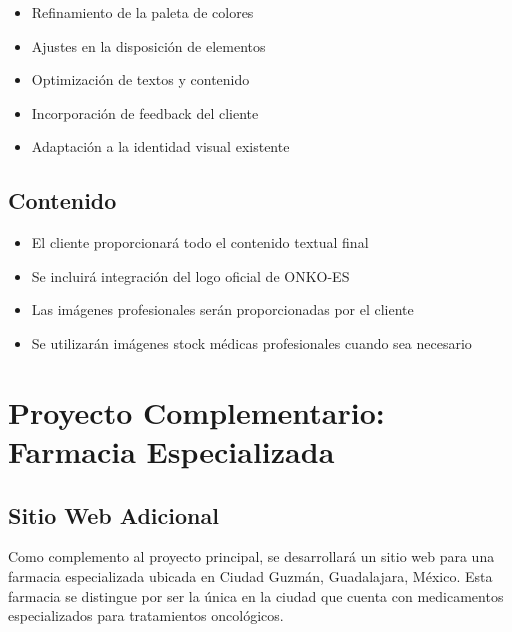 \documentclass[12pt,a4paper]{article}
\begin{document}
\begin{itemize}
    \item Refinamiento de la paleta de colores
    \item Ajustes en la disposición de elementos
    \item Optimización de textos y contenido
    \item Incorporación de feedback del cliente
    \item Adaptación a la identidad visual existente
\end{itemize}

\subsection{Contenido}
\begin{itemize}
    \item El cliente proporcionará todo el contenido textual final
    \item Se incluirá integración del logo oficial de ONKO-ES
    \item Las imágenes profesionales serán proporcionadas por el cliente
    \item Se utilizarán imágenes stock médicas profesionales cuando sea necesario
\end{itemize}

\section{Proyecto Complementario: Farmacia Especializada}

\subsection{Sitio Web Adicional}
Como complemento al proyecto principal, se desarrollará un sitio web para una farmacia especializada ubicada en Ciudad Guzmán, Guadalajara, México. Esta farmacia se distingue por ser la única en la ciudad que cuenta con medicamentos especializados para tratamientos oncológicos.
\end{document}
